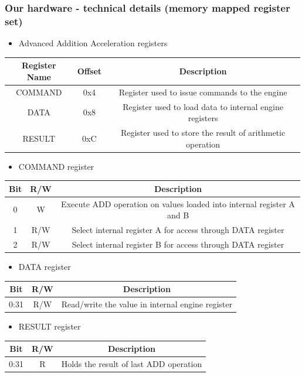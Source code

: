 \documentclass[dvipsnames,table]{beamer}
\begin{document}
\begin{frame}
\label{faaop}
\frametitle{Our hardware - technical details (memory mapped register set)}
\begin{itemize}
	\item Advanced Addition Acceleration registers
\end{itemize}
\tiny
\begin{center}
\begin{tabular}{|c|c|c|}
\hline
Register Name & Offset & Description \\
\hline
\hline
COMMAND & 0x4 & Register used to issue commands to the engine \\
\hline
DATA & 0x8 & Register used to load data to internal engine registers \\
\hline
RESULT & 0xC & Register used to store the result of arithmetic operation \\
\hline
\end{tabular}
\end{center}
\begin{itemize}
	\item COMMAND register 
\end{itemize}
\begin{center}
\begin{tabular}{|c|c|c|}
\hline
Bit & R/W & Description \\
\hline
\hline
0 & W & Execute ADD operation on values loaded into internal register A and B \\
\hline
1 & R/W & Select internal register A for access through DATA register  \\
\hline
2 & R/W & Select internal register B for access through DATA register \\
\hline
\end{tabular}
\end{center}

\begin{itemize}
	\item DATA register
\end{itemize}
\begin{center}
\begin{tabular}{|c|c|c|}
\hline
Bit & R/W & Description \\
\hline
\hline
0:31 & R/W & Read/write the value in internal engine register \\
\hline
\end{tabular}
\end{center}

\begin{itemize}
	\item RESULT register 
\end{itemize}
\begin{center}
\begin{tabular}{|c|c|c|}
\hline
Bit & R/W & Description \\
\hline
\hline
0:31 & R & Holds the result of last ADD operation \\
\hline
\end{tabular}
\end{center}

\end{frame}
\end{document}
